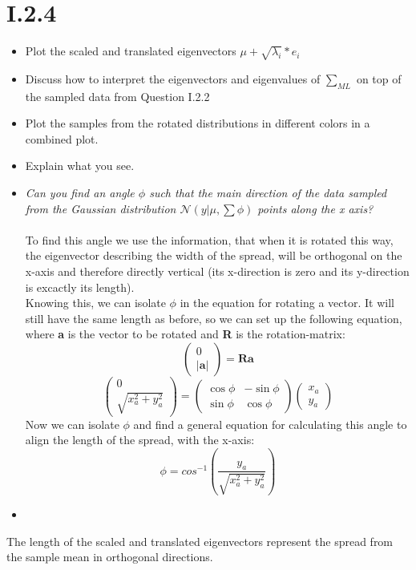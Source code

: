 \documentclass[12pt, a4paper]{article}
\begin{document}
\section{I.2.4}
\begin{itemize}
\item Plot the scaled and translated eigenvectors
$\mu + \sqrt{\lambda_i} * e_i$
\item Discuss how to interpret the
eigenvectors and eigenvalues of $\sum _{ML} $
on top of the sampled data from Question I.2.2
\item Plot the samples from the rotated distributions in different colors in a combined plot.
\item Explain what you see.
\item \textit{Can you find an angle $\phi$ such that the main direction of the data sampled from
the Gaussian distribution $\mathcal{N}(y|\mu, \sum \phi )$ points along the x axis?}\\\\
To find this angle we use the information, that when it is rotated this way, the eigenvector describing the width of the spread, will be orthogonal on the x-axis and therefore directly vertical (its x-direction is zero and its y-direction is excactly its length).\\
Knowing this, we can isolate $\phi$ in the equation for rotating a vector. It will still have the same length as before, so we can set up the following equation, where \textbf{a} is the vector to be rotated and \textbf{R} is the rotation-matrix:
\begin{equation*}
\left( \begin{array}{c}
0 \\
|\textbf{a}| \end{array} \right)
=
\textbf{R}\textbf{a}
\end{equation*}
\begin{equation*}
\left( \begin{array}{c}
0 \\
\sqrt{x_a^2+y_a^2} 
\end{array} \right)
=
\left( \begin{array}{cc}
\cos \phi & -\sin \phi \\
\sin \phi & \cos \phi \end{array} \right)
\left( \begin{array}{c}
x_a \\
y_a \end{array} \right)
\end{equation*} 
Now we can isolate $\phi$ and find a general equation for calculating this angle to align the length of the spread, with the x-axis:
\begin{equation*}
\phi = cos^{-1}\left(\dfrac{y_a}{\sqrt{x_a^2+y_a^2}}\right)
\end{equation*} 

\item 
\end{itemize}
The length of the scaled and translated eigenvectors represent the spread from the sample mean in orthogonal directions. 
\end{document}

